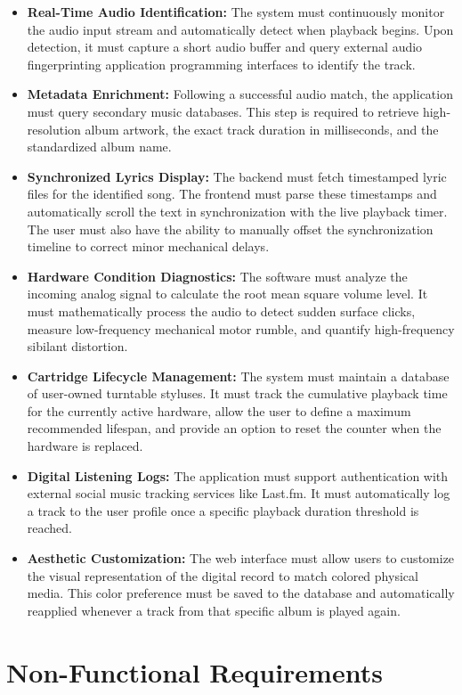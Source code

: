 \documentclass[12pt,a4paper,english]{report}
\begin{document}
\begin{itemize}
    \item \textbf{Real-Time Audio Identification:} The system must continuously monitor the audio input stream and automatically detect when playback begins. Upon detection, it must capture a short audio buffer and query external audio fingerprinting application programming interfaces to identify the track.
    \item \textbf{Metadata Enrichment:} Following a successful audio match, the application must query secondary music databases. This step is required to retrieve high-resolution album artwork, the exact track duration in milliseconds, and the standardized album name.
    \item \textbf{Synchronized Lyrics Display:} The backend must fetch timestamped lyric files for the identified song. The frontend must parse these timestamps and automatically scroll the text in synchronization with the live playback timer. The user must also have the ability to manually offset the synchronization timeline to correct minor mechanical delays.
    \item \textbf{Hardware Condition Diagnostics:} The software must analyze the incoming analog signal to calculate the root mean square volume level. It must mathematically process the audio to detect sudden surface clicks, measure low-frequency mechanical motor rumble, and quantify high-frequency sibilant distortion.
    \item \textbf{Cartridge Lifecycle Management:} The system must maintain a database of user-owned turntable styluses. It must track the cumulative playback time for the currently active hardware, allow the user to define a maximum recommended lifespan, and provide an option to reset the counter when the hardware is replaced.
    \item \textbf{Digital Listening Logs:} The application must support authentication with external social music tracking services like Last.fm. It must automatically log a track to the user profile once a specific playback duration threshold is reached.
    \item \textbf{Aesthetic Customization:} The web interface must allow users to customize the visual representation of the digital record to match colored physical media. This color preference must be saved to the database and automatically reapplied whenever a track from that specific album is played again.
\end{itemize}

\section{Non-Functional Requirements}
\end{document}
